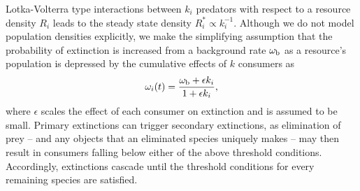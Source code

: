 \documentclass[twocolumn,preprintnumbers,amsmath,amssymb,superscriptaddress]{revtex4}
\begin{document}
Lotka-Volterra type interactions between $k_i$ predators with respect to a resource density $R_i$ leads to the steady state density $R_i^* \propto k_i^{-1}$.
Although we do not model population densities explicitly, we make the simplifying assumption that the probability of extinction is increased from a background rate $\omega_{\rm b}$ as a resource's population is depressed by the cumulative effects of $k$ consumers as
\begin{equation}
  \omega_i(t) = \frac{\omega_{\rm b} + \epsilon k_i}{1 + \epsilon k_i},
\end{equation}
where $\epsilon$ scales the effect of each consumer on extinction and is assumed to be small.
Primary extinctions can trigger secondary extinctions, as elimination of prey -- and any objects that an eliminated species uniquely makes -- may then result in consumers falling below either of the above threshold conditions.
Accordingly, extinctions cascade until the threshold conditions for every remaining species are satisfied.
\end{document}
